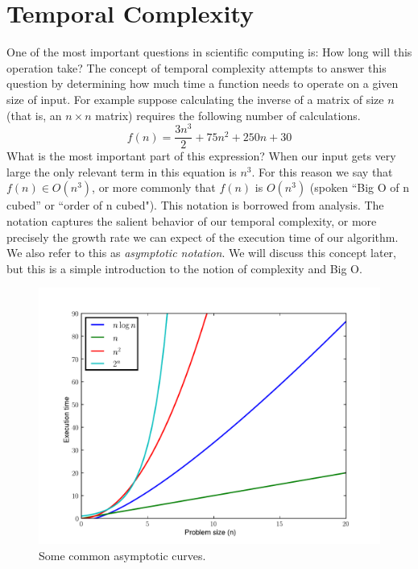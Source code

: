 

\section*{Temporal Complexity}
One of the most important questions in scientific computing is:
How long will this operation take?
The concept of temporal complexity attempts to answer this question by determining
how much time a function needs to operate on a given size of input.
For example suppose calculating the inverse of a matrix of size $n$ (that is, an $n \times n$ matrix)
requires the following number of calculations.
\begin{equation*}
f(n) = \frac{3n^3}{2} + 75n^2 + 250n + 30
\end{equation*}
What is the most important part of this expression?
When our input gets very large the only relevant term in this equation is $n^3$.
For this reason we say that $f(n) \in O(n^3)$, or more commonly that $f(n)$ is $O(n^3)$
(spoken ``Big O of n cubed'' or ``order of n cubed").
This notation is borrowed from analysis. The notation captures the salient behavior of our temporal complexity,
or more precisely the growth rate we can expect of the execution time of our algorithm.
We also refer to this as \emph{asymptotic notation}.
We will discuss this concept later, but this is a simple introduction to the notion of complexity and Big O.
\begin{figure}[h]
\centering
\includegraphics[width=\textwidth]{complexitycurves.pdf}
\caption{Some common asymptotic curves.}
\end{figure}

